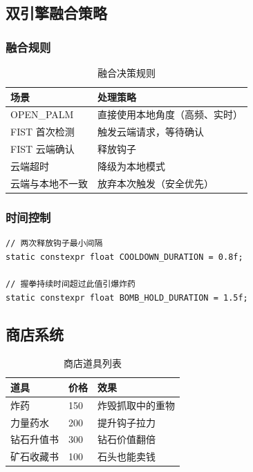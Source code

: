 \documentclass{article}
\begin{document}
\subsection{双引擎融合策略}

\subsubsection{融合规则}

\begin{table}[H]
\centering
\begin{tabular}{|l|l|}
\hline
\textbf{场景} & \textbf{处理策略} \\
\hline
OPEN\_PALM & 直接使用本地角度（高频、实时） \\
\hline
FIST 首次检测 & 触发云端请求，等待确认 \\
\hline
FIST 云端确认 & 释放钩子 \\
\hline
云端超时 & 降级为本地模式 \\
\hline
云端与本地不一致 & 放弃本次触发（安全优先） \\
\hline
\end{tabular}
\caption{融合决策规则}
\end{table}

\subsubsection{时间控制}

\begin{lstlisting}[caption=时间控制常量]
// 两次释放钩子最小间隔
static constexpr float COOLDOWN_DURATION = 0.8f;

// 握拳持续时间超过此值引爆炸药
static constexpr float BOMB_HOLD_DURATION = 1.5f;
\end{lstlisting}

\subsection{商店系统}

\begin{table}[H]
\centering
\begin{tabular}{|l|l|l|}
\hline
\textbf{道具} & \textbf{价格} & \textbf{效果} \\
\hline
炸药 & 150 & 炸毁抓取中的重物 \\
\hline
力量药水 & 200 & 提升钩子拉力 \\
\hline
钻石升值书 & 300 & 钻石价值翻倍 \\
\hline
矿石收藏书 & 100 & 石头也能卖钱 \\
\hline
\end{tabular}
\caption{商店道具列表}
\end{table}
\end{document}
